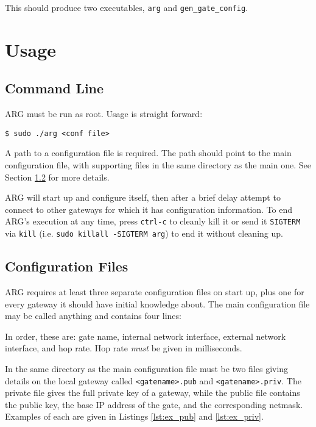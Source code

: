 \par This should produce two executables, \texttt{arg} and \texttt{gen\_gate\_config}.

\section{Usage}
\label{sec:arg_cmd}
\subsection{Command Line}
\par \ac{ARG} must be run as root. Usage is straight forward:
\begin{lstlisting}[numbers=none] 
$ sudo ./arg <conf file>
\end{lstlisting}

\par A path to a configuration file is required. The path should point to the main configuration file, with supporting files in the same directory as the main one. See Section \ref{sec:arg_conf_files} for more details.

\par \ac{ARG} will start up and configure itself, then after a brief delay attempt to connect to other gateways for which it has configuration information. To end \acs{ARG}'s execution at any time, press \texttt{ctrl-c} to cleanly kill it or send it \texttt{SIGTERM} via \texttt{kill} (i.e. \lstinline{sudo killall -SIGTERM arg}) to end it without cleaning up.

\subsection{Configuration Files}
\label{sec:arg_conf_files}
\par \ac{ARG} requires at least three separate configuration files on start up, plus one for every gateway it should have initial knowledge about. The main configuration file may be called anything and contains four lines:


\par In order, these are: gate name, internal network interface, external network interface, and hop rate. Hop rate \textit{must} be given in milliseconds.

\par In the same directory as the main configuration file must be two files giving details on the local gateway called \texttt{<gatename>.pub} and \texttt{<gatename>.priv}. The private file gives the full private key of a gateway, while the public file contains the public key, the base \ac{IP} address of the gate, and the corresponding netmask. Examples of each are given in Listings \ref{lst:ex_pub} and \ref{lst:ex_priv}.



